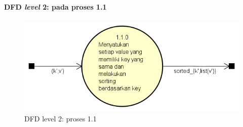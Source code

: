 \paragraph{DFD \textit{level} 2: pada proses 1.1}
\begin{figure}[H]
	\centering
	\includegraphics[scale=0.65]{Diagram/DFD_1_2_Training_Test_SS}
	\caption[DFD level 2: proses 1.1]{DFD level 2: proses 1.1}
	\label{fig:DFD level 2: proses 1.1}
\end{figure}

